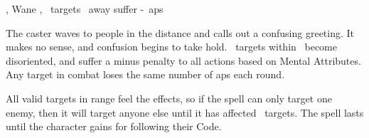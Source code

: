   {\mWater, \mFate}%
  {Wane}%
  {\distant, \duplicated}%
  {}%
  {\spellArea\ targets \spellRange\ away suffer -~\glspl{ap}}%
  {
    The caster waves to people in the distance and calls out a confusing greeting.
    It makes no sense, and confusion begins to take hold.
    \spellArea\ targets within \spellRange\ become disoriented, and suffer a minus  penalty to all actions based on Mental Attributes.
    Any target in combat loses the same number of \glspl{ap} each round.

    All valid targets in range feel the effects, so if the spell can only target one enemy, then it will target anyone else until it has affected \spellArea\ targets.
    The spell lasts until the character gains  for following their Code.
  }

